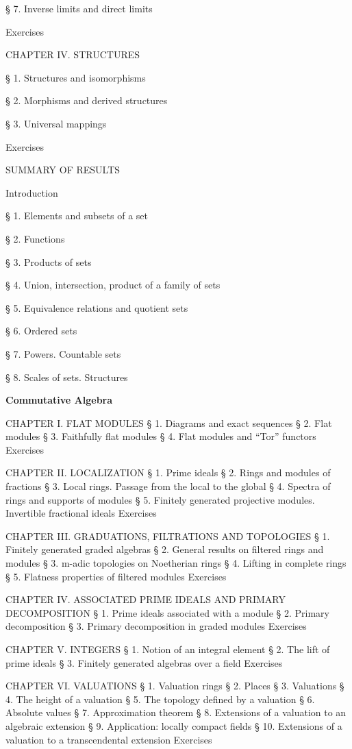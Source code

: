 § 7. Inverse limits and direct limits

Exercises

CHAPTER IV. STRUCTURES

§ 1. Structures and isomorphisms

§ 2. Morphisms and derived structures

§ 3. Universal mappings

Exercises

SUMMARY OF RESULTS

Introduction

§ 1. Elements and subsets of a set

§ 2. Functions

§ 3. Products of sets

§ 4. Union, intersection, product of a family of sets

§ 5. Equivalence relations and quotient sets

§ 6. Ordered sets

§ 7. Powers. Countable sets

§ 8. Scales of sets. Structures

\textbf{Commutative Algebra}

CHAPTER I. FLAT MODULES § 1. Diagrams and exact sequences § 2. Flat modules § 3. Faithfully flat modules § 4. Flat modules and ``Tor'' functors Exercises

CHAPTER II. LOCALIZATION § 1. Prime ideals § 2. Rings and modules of fractions § 3. Local rings. Passage from the local to the global § 4. Spectra of rings and supports of modules § 5. Finitely generated projective modules. Invertible fractional ideals Exercises

CHAPTER III. GRADUATIONS, FILTRATIONS AND TOPOLOGIES § 1. Finitely generated graded algebras § 2. General results on filtered rings and modules § 3. m-adic topologies on Noetherian rings § 4. Lifting in complete rings § 5. Flatness properties of filtered modules Exercises

CHAPTER IV. ASSOCIATED PRIME IDEALS AND PRIMARY DECOMPOSITION § 1. Prime ideals associated with a module § 2. Primary decomposition § 3. Primary decomposition in graded modules Exercises

CHAPTER V. INTEGERS § 1. Notion of an integral element § 2. The lift of prime ideals § 3. Finitely generated algebras over a field Exercises

CHAPTER VI. VALUATIONS § 1. Valuation rings § 2. Places § 3. Valuations § 4. The height of a valuation § 5. The topology defined by a valuation § 6. Absolute values § 7. Approximation theorem § 8. Extensions of a valuation to an algebraic extension § 9. Application: locally compact fields § 10. Extensions of a valuation to a transcendental extension Exercises

